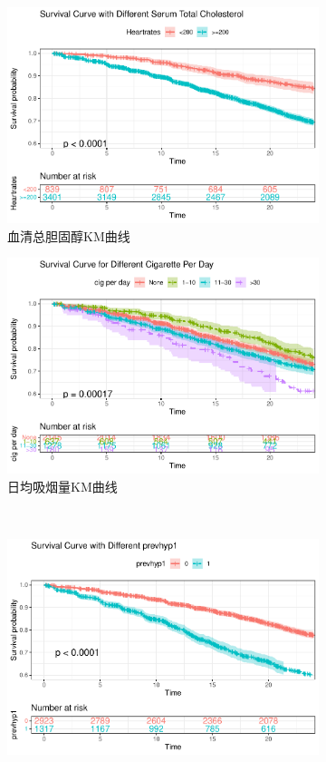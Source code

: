\documentclass[lang=cn,11pt,a4paper,cite=super,AutoFakeBold]{elegantpaper}
\begin{document}
\begin{figure}[!htbp]
\begin{subfigure}[b]{0.49\textwidth}
      \includegraphics[width=\linewidth]{img/km-3.pdf}  
    \caption{血清总胆固醇KM曲线}
    \label{fig:km3}
    \end{subfigure}
   \begin{subfigure}[b]{0.49\textwidth}
      \centering
      \includegraphics[width=\linewidth]{img/km-4.pdf}  
    \caption{日均吸烟量KM曲线}
    \label{fig:km4}
    \end{subfigure}
    ~
    \begin{center}
    \begin{subfigure}[t]{0.49\textwidth}
      \centering
      \includegraphics[width=\linewidth]{img/km-5.pdf}  

\end{subfigure}
\end{center}
\end{figure}
\end{document}
